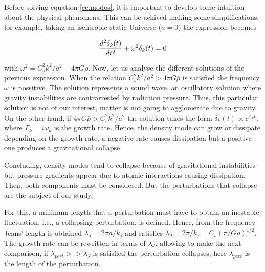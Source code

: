 Before solving equation \ref{ec.modos}, it is important to develop
some intuition about the	 physical phenomena. This can be achived making some 
simplifications, for example, taking an isentropic static Universe ($\dot{a}=0$)
the expression becomes

\[
\frac{d^2\delta_k(t)}{dt^2} + \omega^2\delta_k(t) = 0
\]

with $\omega^2 = C_s^2k^2/a^2-4\pi G\overline{\rho}$. Now, let us analyse
the different solutions of the previous expression. When the relation 
$C_s^2k^2/a^2>4\pi G\overline{\rho}$ is satisfied the frequency $\omega$ is
possitive. The solution represents a sound wave, an oscillatory solution where 
gravity instabilities are contrarrested by radiation pressure. Thus, this 
particular solution is not of our interest, matter is not going to agglomerate due 
to gravity. 
On the other hand, if $4\pi G\overline{\rho}>C_s^2k^2/a^2$ the solution takes the form 
$\delta_k(t)\propto e^{\Gamma_k t}$, where $\Gamma_k=i\omega_k$ is the growth rate. 
Hence, the density mode can grow or dissipate depending on the growth rate, a negative 
rate causes dissipation but a positive one produces a gravitational collapse.

Concluding, density modes tend to collapse because of gravitational instabilities but 
pressure gradients appear due to atomic interactions causing dissipation. Then, both 
components must be considered. 
But the perturbations that collapse are the subject of our study. 


For this, a minimum length that a perturbation must have to obtain an 
inestable fluctuation, i.e., a collapsing
perturbation, is defined. Hence, from the frequency Jeans' length
is obtained $\lambda_J = 2\pi a/k_j$ and satisfies 
$\lambda_J = 2\pi/k_j = C_s(\pi/G\rho)^{1/2}$.
The growth rate can be rewritten in terms of $\lambda_J$, 
allowing to make the next comparison, if $\lambda_{pert}>>\lambda_J$
is satisfied the perturbation collapses, here $\lambda_{pert}$
is the length of the perturbation.


